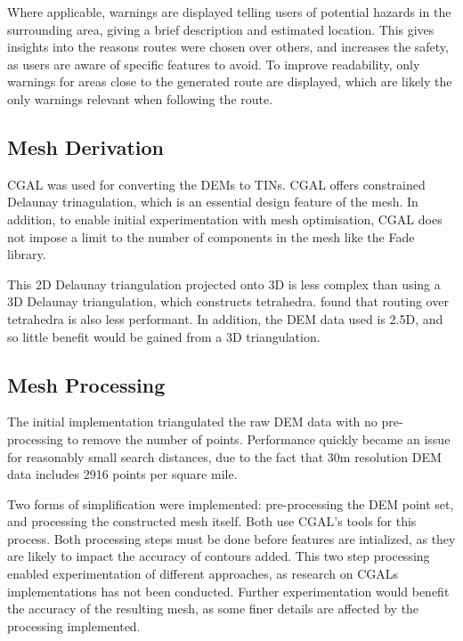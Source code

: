 \documentclass[12pt]{article}
\begin{document}
Where applicable, warnings are displayed telling users of potential hazards in the surrounding area, giving a brief description and estimated location. This gives insights into the reasons routes were chosen over others, and increases the safety, as users are aware of specific features to avoid. To improve readability, only warnings for areas close to the generated route are displayed, which are likely the only warnings relevant when following the route.

\subsection{Mesh Derivation}

CGAL was used for converting the DEMs to TINs. CGAL offers constrained Delaunay trinagulation, which is an essential design feature of the mesh. In addition, to enable initial experimentation with mesh optimisation, CGAL does not impose a limit to the number of components in the mesh like the Fade library.


This 2D Delaunay triangulation projected onto 3D is less complex than using a 3D Delaunay triangulation, which constructs tetrahedra. \textcite{perkins2013fielddstar} found that routing over tetrahedra is also less performant. In addition, the DEM data used is 2.5D, and so little benefit would be gained from a 3D triangulation.

\subsection{Mesh Processing}

The initial implementation triangulated the raw DEM data with no pre-processing to remove the number of points. Performance quickly became an issue for reasonably small search distances, due to the fact that 30m resolution DEM data includes 2916 points per square mile.

Two forms of simplification were implemented: pre-processing the DEM point set, and processing the constructed mesh itself. Both use CGAL's tools for this process. Both processing steps must be done before features are intialized, as they are likely to impact the accuracy of contours added. This two step processing enabled experimentation of different approaches, as research on CGALs implementations has not been conducted. Further experimentation would benefit the accuracy of the resulting mesh, as some finer details are affected by the processing implemented.
\end{document}
